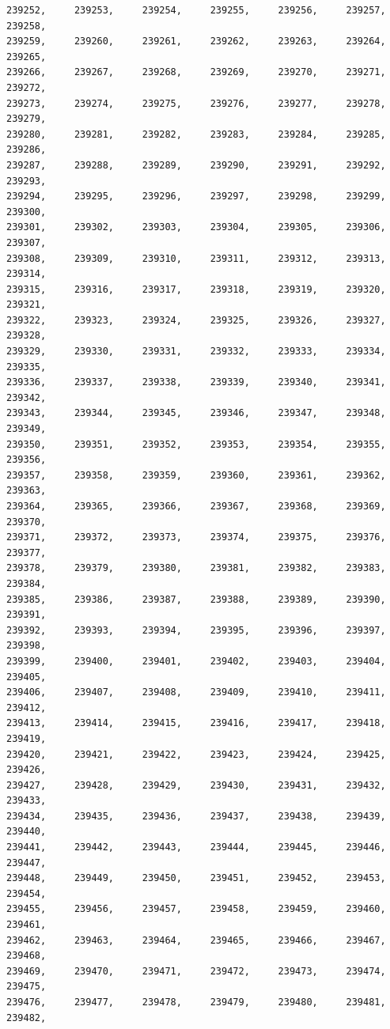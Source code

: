\documentclass[a4paper,11pt]{report}
\begin{document}
\begin{verbatim}
239252,     239253,     239254,     239255,     239256,     239257,     239258,
239259,     239260,     239261,     239262,     239263,     239264,     239265,
239266,     239267,     239268,     239269,     239270,     239271,     239272,
239273,     239274,     239275,     239276,     239277,     239278,     239279,
239280,     239281,     239282,     239283,     239284,     239285,     239286,
239287,     239288,     239289,     239290,     239291,     239292,     239293,
239294,     239295,     239296,     239297,     239298,     239299,     239300,
239301,     239302,     239303,     239304,     239305,     239306,     239307,
239308,     239309,     239310,     239311,     239312,     239313,     239314,
239315,     239316,     239317,     239318,     239319,     239320,     239321,
239322,     239323,     239324,     239325,     239326,     239327,     239328,
239329,     239330,     239331,     239332,     239333,     239334,     239335,
239336,     239337,     239338,     239339,     239340,     239341,     239342,
239343,     239344,     239345,     239346,     239347,     239348,     239349,
239350,     239351,     239352,     239353,     239354,     239355,     239356,
239357,     239358,     239359,     239360,     239361,     239362,     239363,
239364,     239365,     239366,     239367,     239368,     239369,     239370,
239371,     239372,     239373,     239374,     239375,     239376,     239377,
239378,     239379,     239380,     239381,     239382,     239383,     239384,
239385,     239386,     239387,     239388,     239389,     239390,     239391,
239392,     239393,     239394,     239395,     239396,     239397,     239398,
239399,     239400,     239401,     239402,     239403,     239404,     239405,
239406,     239407,     239408,     239409,     239410,     239411,     239412,
239413,     239414,     239415,     239416,     239417,     239418,     239419,
239420,     239421,     239422,     239423,     239424,     239425,     239426,
239427,     239428,     239429,     239430,     239431,     239432,     239433,
239434,     239435,     239436,     239437,     239438,     239439,     239440,
239441,     239442,     239443,     239444,     239445,     239446,     239447,
239448,     239449,     239450,     239451,     239452,     239453,     239454,
239455,     239456,     239457,     239458,     239459,     239460,     239461,
239462,     239463,     239464,     239465,     239466,     239467,     239468,
239469,     239470,     239471,     239472,     239473,     239474,     239475,
239476,     239477,     239478,     239479,     239480,     239481,     239482,

\end{verbatim}
\end{document}
